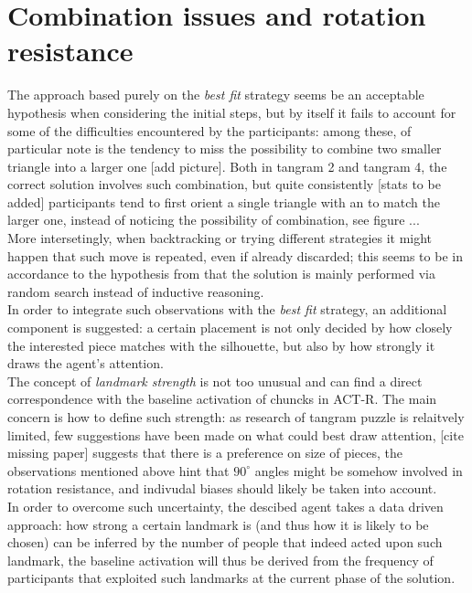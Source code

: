 \documentclass[a4paper,singleside,12pt]{report} %
\begin{document}
	\section*{Combination issues and rotation resistance}
	The approach based purely on the \textit{best fit} strategy seems be an acceptable hypothesis
	when considering the initial steps, but by itself it fails to account for some of the difficulties
	encountered by the participants: among these, of particular note is the tendency to miss the
	possibility to combine two smaller triangle into a larger one [add picture]. Both in tangram 2
	and tangram 4, the correct solution involves such combination, but quite consistently [stats to
	be added] participants tend to first orient a single triangle with an to match the
	larger one, instead of noticing the possibility of combination, see figure ... \\
	More intersetingly, when backtracking or trying different strategies it might happen that such
	move is repeated, even if already discarded; this seems to be in accordance to the hypothesis
	from \cite{Hu2019EffectiveCO} that the solution is mainly performed via random search instead of
	inductive reasoning.\\
	In order to integrate such observations with the \textit{best fit} strategy, an additional
	component is suggested: a certain placement is not only decided by how closely the interested
	piece matches with the silhouette, but also by how strongly it draws the agent's attention.\\
	The concept of \textit{landmark strength} is not too unusual and can find a direct
	correspondence with the baseline activation of chuncks in ACT-R. The main concern is how to
	define such strength: as research of tangram puzzle is relaitvely limited, few suggestions have
	been made on what could best draw attention, [cite missing paper] suggests that there is a
	preference on size of pieces, the observations mentioned above hint that $90^{\circ}$ angles might be
	somehow involved in rotation resistance, and indivudal biases should likely be taken into
	account.\\
	In order to overcome such uncertainty, the descibed agent takes a data driven approach: how
	strong a certain landmark is (and thus how it is likely to be chosen) can be inferred by the
	number of people that indeed acted upon such landmark, the baseline activation will thus be
	derived from the frequency of participants that exploited such landmarks at the current phase of
	the solution.
\end{document}
